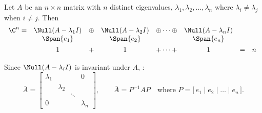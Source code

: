 \begin{theorem}
\leavevmode{}Let $A$ be an $n\times n$ matrix with $n$ distinct eigenvalues, $\lambda_1,\lambda_2,\dots,\lambda_n$ where $\lambda_i\neq\lambda_j$ when $i\neq j$. Then
\[
\begin{array}{rccccccc@{\;}l}
\C^n = & \Null(A-\lambda_1 I) & \oplus & \Null(A-\lambda_2 I) & \oplus\cdots\oplus & \Null(A-\lambda_n I) & & & \\
 & \Span\{e_1\} & & \Span\{e_2\} & & \Span\{e_n\} & & & \\[4pt]
 & 1 & + & 1 & +\cdots+ & 1 & = & n &
\end{array}
\]
\end{theorem}
Since $\Null(A-\lambda_i I)$ is invariant under $A$, :
\[
\bar A=\begin{bmatrix}\lambda_1 & & & 0\\ & \lambda_2 & & \\ & & \ddots & \\ 0 & & & \lambda_n\end{bmatrix},
\qquad \bar A = P^{-1}AP \quad\text{where } P=\big[\,e_1 \mid e_2 \mid \dots \mid e_n\,\big].
\]

